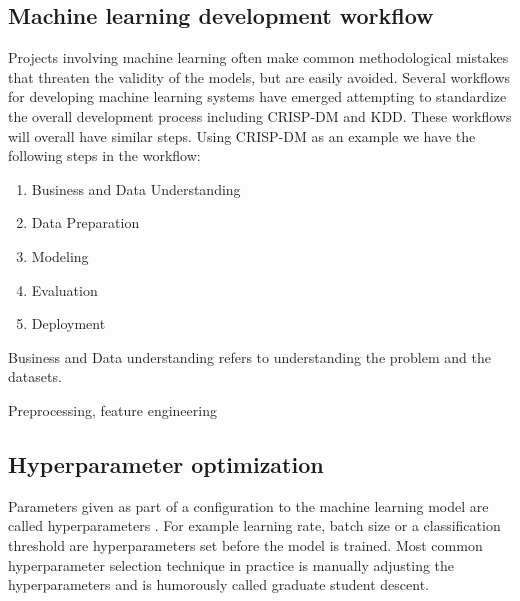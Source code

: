 \subsection{Machine learning development workflow}
\label{sec:mlworkflow}


Projects involving machine learning often make common methodological mistakes that threaten the validity of the models, but are easily avoided. %
Several workflows for developing machine learning systems have emerged attempting to standardize the overall development process including CRISP-DM and KDD.  %
These workflows will overall have similar steps. Using CRISP-DM as an example we have the following steps in the workflow:  %

\begin{enumerate}
    \item Business and Data Understanding
    \item Data Preparation
    \item Modeling
    \item Evaluation
    \item Deployment
\end{enumerate}



 Business and Data understanding refers to understanding the problem and the datasets. %


Preprocessing, feature engineering





\subsection{Hyperparameter optimization}


Parameters given as part of a configuration to the machine learning model are called hyperparameters \parencite{yangHyperparameterOptimizationMachine2020}.
For example learning rate, batch size or a classification threshold are hyperparameters set before the model is trained.
 Most common hyperparameter selection technique in practice is manually adjusting the hyperparameters and is humorously called graduate student descent. %

